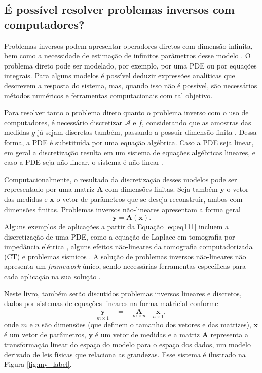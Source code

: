 \subsection{É possível resolver problemas inversos com computadores?}
Problemas inversos podem apresentar operadores diretos com dimensão infinita, bem como a necessidade de estimação de infinitos parâmetros desse modelo \cite[págs. 49-50]{Neto2005}. O problema direto pode ser modelado, por exemplo, por uma PDE ou por equações integrais. Para alguns modelos é possível deduzir expressões analíticas que descrevem a resposta do sistema, mas, quando isso não é possível, são necessários métodos numéricos e ferramentas computacionais com tal objetivo. 

Para resolver tanto o problema direto quanto o problema inverso com o uso de computadores, é necessário discretizar $\mathcal{A}$ e $f$, considerando que as amostras das medidas $g$ já sejam discretas também, passando a possuir dimensão finita \cite[pág. 23]{hansen2010discrete}. Dessa forma, a PDE é substituída por uma equação algébrica. Caso a PDE seja linear, em geral a discretização resulta em um sistema de equações algébricas lineares, e caso a PDE seja não-linear, o sistema é não-linear \cite[pág. 310]{pinchover2005introduction}. 

Computacionalmente, o resultado da discretização desses modelos pode ser representado por uma matriz $\mathbf{A}$ com dimensões finitas. Seja também $\mathbf{y}$ o vetor das medidas e $\mathbf{x}$ o vetor de parâmetros que se deseja reconstruir, ambos com dimensões finitas. Problemas inversos não-lineares apresentam a forma geral \cite[pág. 257]{aster2019parameter} 
\begin{equation}
\mathbf{y} = \mathbf{A}( \mathbf{x} ).
\label{eq:eq111}
\end{equation}
Alguns exemplos de aplicações a partir da Equação \eqref{eq:eq111} incluem a discretização de uma PDE, como a equação de Laplace em  tomografia por impedância elétrica \cite[pág. 165]{Mueller2012}, alguns efeitos não-lineares da tomografia computadorizada (CT) \cite[Seção 6.1.2]{Woo2012} e problemas sísmicos \cite{Adler2021}. A solução de problemas inversos não-lineares não apresenta um \textit{framework} único, sendo necessárias ferramentas específicas para cada aplicação na sua solução \cite[pág. xi]{Mueller2012}.


Neste livro, também serão discutidos problemas inversos lineares e discretos, dados por sistemas de equações lineares na forma matricial conforme
\begin{equation}
\underset{m \times 1}{\mathbf{y}} \quad = \quad \underset{m \times n}{\mathbf{A}} \quad \underset{n \times 1}{\mathbf{x}},
\label{eq:eq1}
\end{equation}
onde $m$ e $n$ são dimensões (que definem o tamanho dos vetores e das matrizes), $\mathbf{x}$ é um vetor de parâmetros, $\mathbf{y}$ é um vetor de medidas e a matriz $\mathbf{A}$ representa a transformação linear do espaço do modelo para o espaço dos dados, um modelo derivado de leis físicas que relaciona as grandezas. Esse sistema é ilustrado na Figura \ref{fig:my_label}. 

